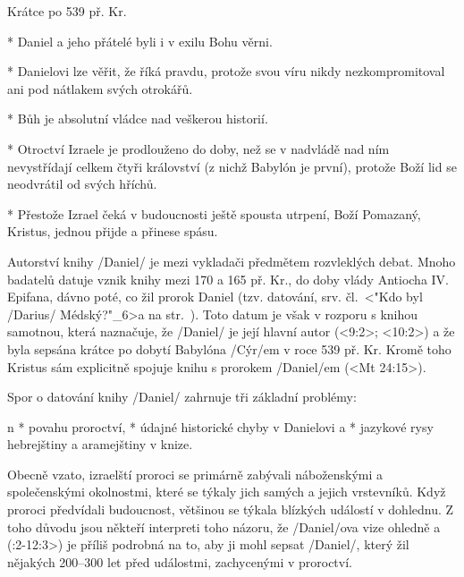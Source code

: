 
 Krátce po 539 př. Kr.


\begitems
* Daniel a jeho přátelé byli i v exilu Bohu věrni.

* Danielovi lze věřit, že říká pravdu, protože svou víru nikdy nezkompromitoval ani pod nátlakem svých otrokářů.

* Bůh je absolutní vládce nad veškerou historií.

* Otroctví Izraele je prodlouženo do doby, než se v nadvládě nad ním nevystřídají celkem čtyři  království (z nichž Babylón je první), protože Boží lid se neodvrátil od svých hříchů. 

* Přestože Izrael čeká v budoucnosti ještě spousta utrpení, Boží Pomazaný, Kristus, jednou přijde a přinese spásu.

\enditems




Autorství knihy \x/Daniel/ je mezi vykladači předmětem rozvleklých debat.
Mnoho badatelů datuje vznik knihy mezi 170 a 165 př. Kr., do doby vlády Antiocha IV. Epifana, dávno poté, co žil prorok Daniel (tzv.  datování, srv. čl.~<"Kdo byl \x/Darius/ Médský?"_6>a na str.~\pg). 
Toto datum je však v rozporu s knihou samotnou, která naznačuje, že \x/Daniel/ je její hlavní autor (<9:2>; <10:2>) a že byla sepsána krátce po dobytí Babylóna \x/Cýr/em v roce 539 př. Kr. Kromě toho  Kristus sám explicitně spojuje knihu s prorokem \x/Daniel/em (<Mt 24:15>).


Spor o datování knihy \x/Daniel/ zahrnuje tři základní problémy:

\begitems \style n
* povahu proroctví,
* údajné historické chyby v Danielovi a 
* jazykové rysy hebrejštiny a aramejštiny v knize.
\enditems

Obecně vzato, izraelští proroci se primárně zabývali náboženskými a společenskými okolnostmi, které se týkaly jich samých a jejich vrstevníků. Když proroci předvídali budoucnost, většinou se týkala blízkých událostí v dohlednu.
Z toho důvodu jsou někteří interpreti toho názoru, že \x/Daniel/ova vize ohledně  a  (:2-12:3>) je příliš podrobná na to, aby ji mohl sepsat \x/Daniel/, který žil nějakých 200--300 let před událostmi, zachycenými v proroctví.

